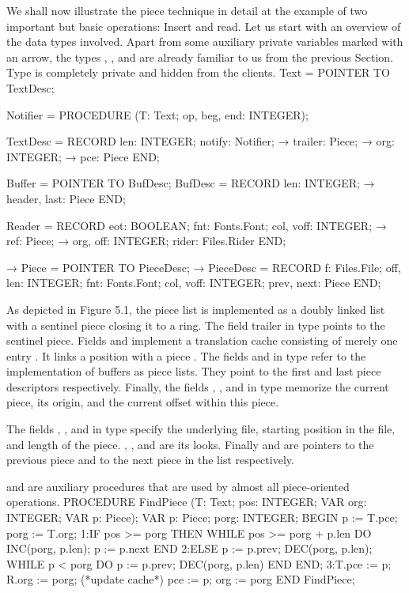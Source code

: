 We shall now illustrate the piece technique in detail at the example of two important but basic operations: Insert and read. Let us start with an overview of the data types involved. Apart from some auxiliary private variables marked with an arrow, the types , , and  are already familiar to us from the previous Section. Type  is completely private and hidden from the clients.
\begintt
Text = POINTER TO TextDesc;

Notifier = PROCEDURE (T: Text; op, beg, end: INTEGER);

TextDesc = RECORD
  len: INTEGER;
  notify: Notifier;
  → trailer: Piece;
  → org: INTEGER;
  → pce: Piece
END;

Buffer = POINTER TO BufDesc;
BufDesc = RECORD
  len: INTEGER;
  → header, last: Piece
END;

Reader = RECORD
  eot: BOOLEAN;
  fnt: Fonts.Font;
  col, voff: INTEGER;
  → ref: Piece;
  → org, off: INTEGER;
  rider: Files.Rider
END;

→ Piece = POINTER TO PieceDesc;
→ PieceDesc = RECORD
  f: Files.File;
  off, len: INTEGER;
  fnt: Fonts.Font;
  col, voff: INTEGER;
  prev, next: Piece
END;
\endtt

\noindent As depicted in Figure 5.1, the piece list is implemented as a doubly
linked list with a sentinel piece closing it to a ring. The field
trailer in type  points to the sentinel piece. Fields  and
 implement a translation cache consisting of merely one entry .
It links a position  with a piece . The fields  and  in type  refer to the implementation of buffers as piece
lists. They point to the first and last piece descriptors
respectively. Finally, the fields , , and  in type 
memorize the current piece, its origin, and the current offset within
this piece.

The fields , , and  in type  specify the underlying file, starting position in the file, and length of the piece. , , and  are its looks. Finally  and  are pointers to the previous piece and to the next piece in the list respectively.

 and  are auxiliary procedures that are used by almost all piece-oriented operations.
\begintt
PROCEDURE FindPiece (T: Text; pos: INTEGER;
                     VAR org: INTEGER; VAR p: Piece);
  VAR p: Piece;
      porg: INTEGER;
BEGIN
  p := T.pce;
  porg := T.org;
1:IF pos >= porg THEN
    WHILE pos >= porg + p.len DO INC(porg, p.len); p := p.next END
2:ELSE p := p.prev; DEC(porg, p.len);
    WHILE p < porg DO p := p.prev; DEC(porg, p.len) END
  END;
3:T.pce := p; R.org := porg; (*update cache*)
  pce := p; org := porg
END FindPiece;
\endtt

